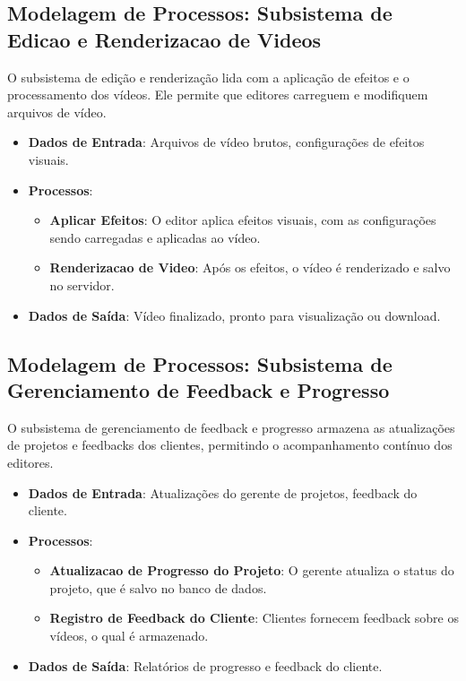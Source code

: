 \subsection{Modelagem de Processos: Subsistema de Edicao e Renderizacao de Videos}
O subsistema de edição e renderização lida com a aplicação de efeitos e o processamento dos vídeos. Ele permite que editores carreguem e modifiquem arquivos de vídeo.

\begin{itemize}
    \item \textbf{Dados de Entrada}: Arquivos de vídeo brutos, configurações de efeitos visuais.
    \item \textbf{Processos}:
        \begin{itemize}
            \item \textbf{Aplicar Efeitos}: O editor aplica efeitos visuais, com as configurações sendo carregadas e aplicadas ao vídeo.
            \item \textbf{Renderizacao de Video}: Após os efeitos, o vídeo é renderizado e salvo no servidor.
        \end{itemize}
    \item \textbf{Dados de Saída}: Vídeo finalizado, pronto para visualização ou download.
\end{itemize}

\subsection{Modelagem de Processos: Subsistema de Gerenciamento de Feedback e Progresso}
O subsistema de gerenciamento de feedback e progresso armazena as atualizações de projetos e feedbacks dos clientes, permitindo o acompanhamento contínuo dos editores.

\begin{itemize}
    \item \textbf{Dados de Entrada}: Atualizações do gerente de projetos, feedback do cliente.
    \item \textbf{Processos}:
        \begin{itemize}
            \item \textbf{Atualizacao de Progresso do Projeto}: O gerente atualiza o status do projeto, que é salvo no banco de dados.
            \item \textbf{Registro de Feedback do Cliente}: Clientes fornecem feedback sobre os vídeos, o qual é armazenado.
        \end{itemize}
    \item \textbf{Dados de Saída}: Relatórios de progresso e feedback do cliente.
\end{itemize}

